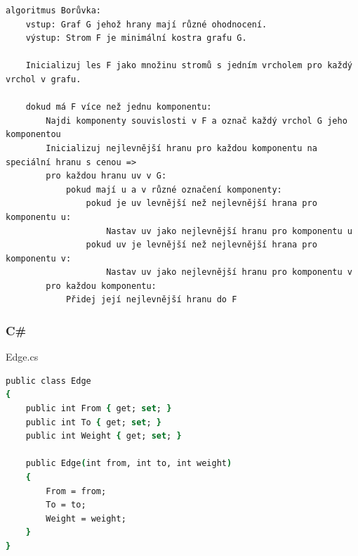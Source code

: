 \documentclass[11pt]{article}
\begin{document}
\begin{lstlisting}
algoritmus Borůvka:
    vstup: Graf G jehož hrany mají různé ohodnocení.
    výstup: Strom F je minimální kostra grafu G.

    Inicializuj les F jako množinu stromů s jedním vrcholem pro každý vrchol v grafu.

    dokud má F více než jednu komponentu:
        Najdi komponenty souvislosti v F a označ každý vrchol G jeho komponentou
        Inicializuj nejlevnější hranu pro každou komponentu na speciální hranu s cenou =>
        pro každou hranu uv v G:
            pokud mají u a v různé označení komponenty:
                pokud je uv levnější než nejlevnější hrana pro komponentu u:
                    Nastav uv jako nejlevnější hranu pro komponentu u
                pokud uv je levnější než nejlevnější hrana pro komponentu v:
                    Nastav uv jako nejlevnější hranu pro komponentu v
        pro každou komponentu:
            Přidej její nejlevnější hranu do F
\end{lstlisting}

\subsubsection{C\#}

\medbreak\noindent
Edge.cs
\begin{lstlisting}[language=csh]
public class Edge
{
    public int From { get; set; }
    public int To { get; set; }
    public int Weight { get; set; }

    public Edge(int from, int to, int weight)
    {
        From = from;
        To = to;
        Weight = weight;
    }
}
\end{lstlisting}
\end{document}
